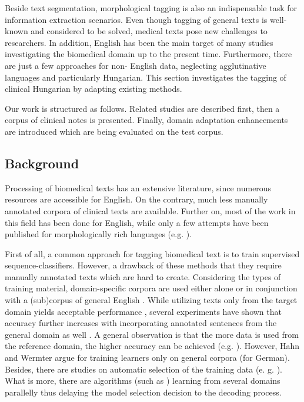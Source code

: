 Beside text segmentation, morphological tagging is also an indispensable task for information extraction scenarios. 
Even though tagging of general texts is well-known and considered to be solved, medical texts pose new challenges to researchers. 
In addition, English has been the main target of many studies investigating the biomedical domain up to the present time. 
Furthermore, there are just a few approaches for non- English data, neglecting agglutinative languages and particularly Hungarian.
This section investigates the tagging of clinical Hungarian by adapting existing methods.%

Our work is structured as follows. 
Related studies are described first, then a corpus of clinical notes is presented.
Finally, domain adaptation enhancements are introduced which are being evaluated on the test corpus.

\subsection{Background}
\label{sec:biomed_tag}

Processing of biomedical texts has an extensive literature, since numerous resources are accessible for English. 
On the contrary, much less manually annotated corpora of clinical texts are available. 
Further on, most of the work in this field has been done for English, while only a few attempts have been published for morphologically rich languages (e.g. \cite{oleynik2009performance,rost2008lessons}).

First of all, a common approach for tagging biomedical text is to train supervised sequence-classifiers. 
However, a drawback of these methods that they require manually annotated texts which are hard to create. %
Considering the types of training material, domain-specific corpora are used either alone \cite{pakhomov2006developing,Savova2010,Smith2006} or in conjunction with a (sub)corpus of general English \cite{coden2005domain,ferraro2013improving,miller2007building}. %
While utilizing texts only from the target domain yields acceptable performance \cite{pakhomov2006developing,Savova2010,Smith2006}, 
several experiments have shown that accuracy further increases with incorporating annotated sentences from the general domain as well \cite{barrett2011token,coden2005domain}. 
A general observation is that the more data is used from the reference domain, the higher accuracy can be achieved (e.g. \cite{pestian2004development}). 
However, Hahn and Wermter argue for training learners only on general corpora \cite{hahn2004tagging} (for German). 
Besides, there are studies on automatic selection of the training data (e. g. \cite{liu2007heuristic}). %
What is more, there are algorithms (such as \cite{choi2012fast}) learning from several domains parallelly thus delaying the model selection decision to the decoding process. 

